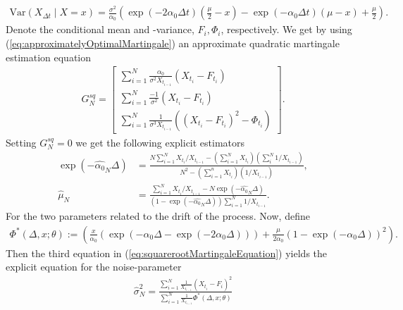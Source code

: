 \begin{align}
    \mathrm{Var}\left(X_{\Delta t} \middle| X = x \right) = \frac{\sigma^2}{\alpha_0}\left(\exp\left(-2\alpha_0\Delta t \right)\left(\frac{\mu}{2} - x   \right) - \exp\left(-\alpha_0\Delta t\right)\left(\mu - x\right) + \frac{\mu}{2}\right). \label{eq:squarerootCondVariance}
\end{align}
Denote the conditional mean and -variance, $F_i, \Phi_i$, respectively. We get by using (\ref{eq:approximatelyOptimalMartingale}) an approximate quadratic martingale estimation equation
\begin{align}
        G_N^{sq} = \begin{bmatrix}
            \sum_{i = 1}^N \frac{\alpha_0}{\sigma^2 X_{t_{i-1}}}\left(X_{t_i} - F_{t_i}\right)\\
            \sum_{i = 1}^N \frac{-1}{\sigma^2}\left(X_{t_i} - F_{t_i}\right)\\
            \sum_{i = 1}^N \frac{1}{\sigma^3 X_{t_{i-1}}}\left(\left(X_{t_i} - F_{t_i}\right)^2 - \Phi_{t_i}\right) \label{eq:squarerootMartingaleEquation}
        \end{bmatrix}.
\end{align}
Setting $G_N^{sq} = 0$ we get the following explicit estimators
\begin{align}
    \exp\left(-\hat{\alpha_0}_N\Delta\right) &= \frac{N\sum_{i=1}^{N}X_{t_i} / X_{t_{i - 1}} - \left(\sum_{i = 1}^{N}X_{t_i}\right)\left(\sum_{i}^{N}1/X_{t_{i - 1}}\right)}{N^2 - \left(\sum_{i = 1}^{n}X_{t_i}\right)\left(1/X_{t_{i - 1}}\right)},\\
    \hat{\mu}_N &= \frac{\sum_{i = 1}^{N}X_{t_i} / X_{t_{i - 1}} - N \exp\left(-\hat{\alpha_0}_N\Delta\right)}{\left(1-\exp\left(-\hat{\alpha_0}_N\Delta\right)\right)\sum_{i = 1}^{N}1/X_{t_{i - 1}}}.
\end{align}
For the two parameters related to the drift of the process. Now, define
\begin{align}
    \Phi^*(\Delta, x; \theta) := \left(\frac{x}{\alpha_0}\left(\exp\left(-\alpha_0\Delta - \exp\left(-2\alpha_0 \Delta\right)\right)\right) + \frac{\mu}{2\alpha_0}\left(1-\exp\left(-\alpha_0\Delta\right)\right)^2\right).
\end{align}
Then the third equation in (\ref{eq:squarerootMartingaleEquation}) yields the explicit equation for the noise-parameter
\begin{align}
    \hat{\sigma}^2_N = \frac{\sum_{i = 1}^{N}\frac{1}{X_{t_{i - 1}}}\left(X_{t_i} - F_i\right)^2}{\sum_{i = 1}^{N}\frac{1}{X_{t_{i - 1}}}\Phi^*(\Delta, x; \theta)}
\end{align}
